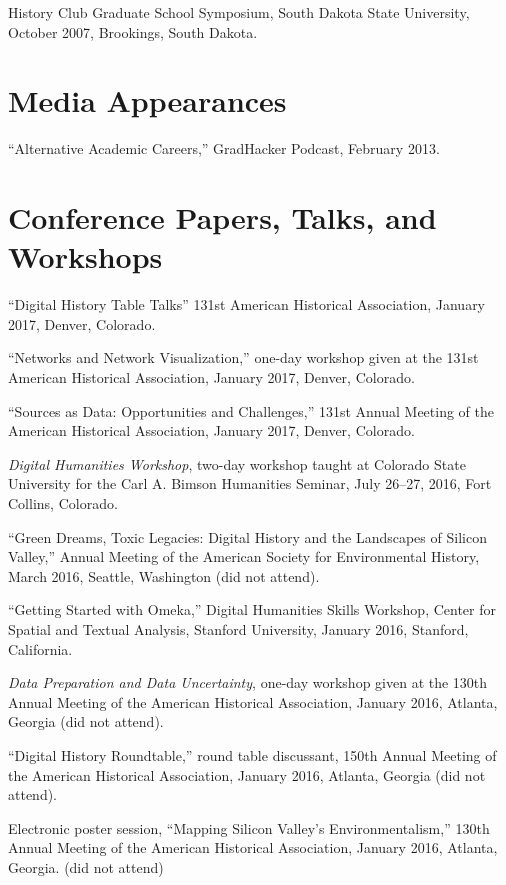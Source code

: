 History Club Graduate School Symposium, South Dakota State University,
October 2007, Brookings, South Dakota.

\section{Media Appearances}\label{media-appearances}

``Alternative Academic Careers,'' GradHacker Podcast, February 2013.

\section{Conference Papers, Talks, and
Workshops}\label{conference-papers-talks-and-workshops}

``Digital History Table Talks'' 131st American Historical Association,
January 2017, Denver, Colorado.

``Networks and Network Visualization,'' one-day workshop given at the
131st American Historical Association, January 2017, Denver, Colorado.

``Sources as Data: Opportunities and Challenges,'' 131st Annual Meeting
of the American Historical Association, January 2017, Denver, Colorado.

\emph{Digital Humanities Workshop}, two-day workshop taught at Colorado
State University for the Carl A. Bimson Humanities Seminar, July 26--27,
2016, Fort Collins, Colorado.

``Green Dreams, Toxic Legacies: Digital History and the Landscapes of
Silicon Valley,'' Annual Meeting of the American Society for
Environmental History, March 2016, Seattle, Washington (did not attend).

``Getting Started with Omeka,'' Digital Humanities Skills Workshop,
Center for Spatial and Textual Analysis, Stanford University, January
2016, Stanford, California.

\emph{Data Preparation and Data Uncertainty}, one-day workshop given at
the 130th Annual Meeting of the American Historical Association, January
2016, Atlanta, Georgia (did not attend).

``Digital History Roundtable,'' round table discussant, 150th Annual
Meeting of the American Historical Association, January 2016, Atlanta,
Georgia (did not attend).

Electronic poster session, ``Mapping Silicon Valley's
Environmentalism,'' 130th Annual Meeting of the American Historical
Association, January 2016, Atlanta, Georgia. (did not attend)

